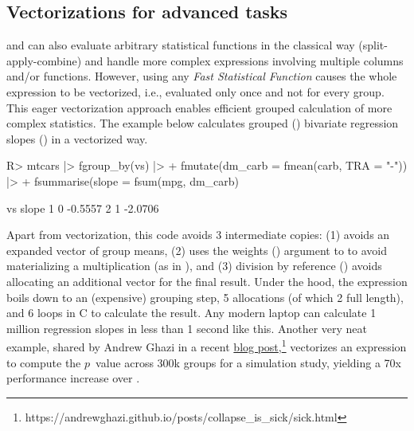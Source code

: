 \documentclass[article]{jss}
\newcommand{\fct}[1]{\code{#1()}}
\begin{document}
\subsection{Vectorizations for advanced tasks} \label{ssec:vfat}
%
\fct{fsummarise} and \fct{fmutate} can also evaluate arbitrary statistical functions in the classical way (split-apply-combine) and handle more complex expressions involving multiple columns and/or functions. However, using any \emph{Fast Statistical Function} causes the whole expression to be vectorized, i.e., evaluated only once and not for every group. This eager vectorization approach enables efficient grouped calculation of more complex statistics. The example below calculates grouped () bivariate regression slopes () in a vectorized way.
%
\begin{Schunk}
\begin{Sinput}
R> mtcars |> fgroup_by(vs) |>
+   fmutate(dm_carb = fmean(carb, TRA = "-")) |>
+   fsummarise(slope = fsum(mpg, dm_carb) %/=% fsum(dm_carb^2))
\end{Sinput}
\begin{Soutput}
  vs   slope
1  0 -0.5557
2  1 -2.0706
\end{Soutput}
\end{Schunk}
%
Apart from vectorization, this code avoids 3 intermediate copies: (1)  avoids an expanded vector of group means, (2)  uses the weights () argument to \fct{fsum} to avoid materializing a multiplication (as in ), and (3) division by reference (\code{\%/=\%}) avoids allocating an additional vector for the final result. Under the hood, the expression boils down to an (expensive) grouping step, 5 allocations (of which 2 full length), and 6 loops in C to calculate the result. Any modern laptop can calculate 1 million regression slopes in less than 1 second like this. Another very neat example, shared by Andrew Ghazi in a recent \href{https://andrewghazi.github.io/posts/collapse\_is\_sick/sick.html}{blog post},\footnote{https://andrewghazi.github.io/posts/collapse\_is\_sick/sick.html} vectorizes an expression to compute the $p$~value across 300k groups for a simulation study, yielding a 70x performance increase over . \newline
\end{document}
